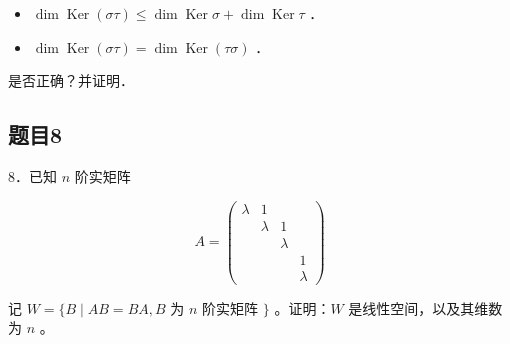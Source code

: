 \documentclass{article}
\begin{document}
\begin{itemize}
  \item[（1）] \(\operatorname{dim} \operatorname{Ker}(\sigma \tau) \leq \operatorname{dim} \operatorname{Ker} \sigma+\operatorname{dim} \operatorname{Ker} \tau\) ．
  \item[（2）] \(\operatorname{dim} \operatorname{Ker}(\sigma \tau)=\operatorname{dim} \operatorname{Ker}(\tau \sigma)\) ．
\end{itemize}

是否正确？并证明．

\subsection{题目8}
8．已知 \(n\) 阶实矩阵

\[
A=\left(\begin{array}{llll}
\lambda & 1 & & \\
& \lambda & 1 & \\
& & \lambda & \\
& & & 1 \\
& & & \lambda
\end{array}\right)
\]

记 \(W=\{B \mid A B=B A, B\) 为 \(n\) 阶实矩阵 \(\}\) 。证明：\(W\) 是线性空间，以及其维数为 \(n\) 。
\end{document}
